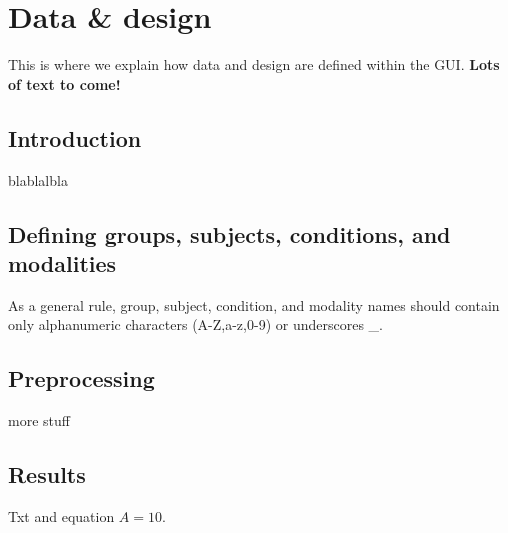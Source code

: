 
\chapter{Data \& design}
\minitoc

This is where we explain how data and design are defined within the GUI.
{\bf Lots of text to come!}

\section{Introduction}

blablalbla

\section{Defining groups, subjects, conditions, and modalities}

As a general rule, group, subject, condition, and modality names should
contain only alphanumeric characters (A-Z,a-z,0-9) or underscores \_.

\section{Preprocessing}

more stuff

\section{Results}

Txt and equation $A=10$.